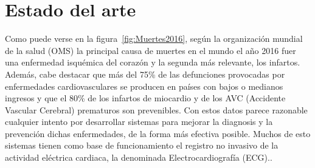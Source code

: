 
\minitoc

%
%
%
%

\section{Estado del arte}

Como puede verse en la figura~\ref{fig:Muertes2016}, según la organización mundial de la salud (OMS) la principal causa de muertes en el mundo el año 2016 fuer una enfermedad isquémica del corazón y la segunda más relevante, los infartos. Además, cabe destacar que más del 75\% de las defunciones provocadas por enfermedades cardiovasculares se producen en países con bajos o medianos ingresos y que el 80\% de los infartos de miocardio y de los AVC (Accidente Vascular Cerebral) prematuros son prevenibles. Con estos datos parece razonable cualquier intento por desarrollar sistemas para mejorar la diagnosis y la prevención dichas enfermedades, de la forma más efectiva posible. Muchos de esto sistemas tienen como base de funcionamiento el registro no invasivo de la actividad eléctrica cardiaca, la denominada Electrocardiografía (ECG).. 

